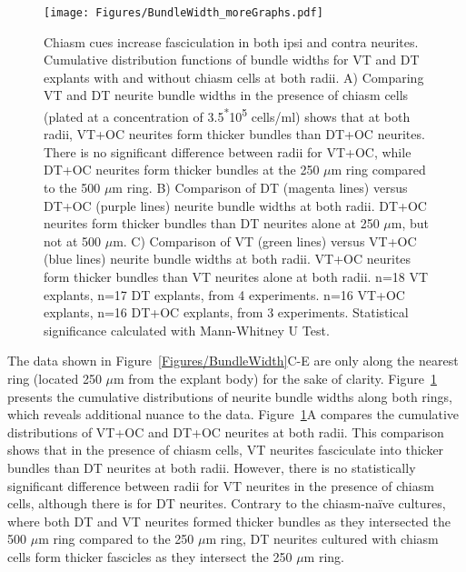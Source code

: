 \begin{figure}[hbtp]
    \begin{center}
        \texttt{[image: Figures/BundleWidth\_moreGraphs.pdf]}
        \caption[Chiasm cues increase fasciculation in both ipsi and contra neurites.]
        {Chiasm cues increase fasciculation in both ipsi and contra neurites.
        Cumulative distribution functions of bundle widths for VT and DT explants with and without chiasm cells at both radii.
        A) Comparing VT and DT neurite bundle widths in the presence of chiasm cells (plated at a concentration of 3.5\textsuperscript{*}10\textsuperscript{5} cells/ml) shows that at both radii, VT+OC neurites form thicker bundles than DT+OC neurites.
        There is no significant difference between radii for VT+OC, while DT+OC neurites form thicker bundles at the 250 $\mu$m ring compared to the 500 $\mu$m ring.
        B) Comparison of DT (magenta lines) versus DT+OC (purple lines) neurite bundle widths at both radii.
        DT+OC neurites form thicker bundles than DT neurites alone at 250 $\mu$m, but not at 500 $\mu$m.
        C) Comparison of VT (green lines) versus VT+OC (blue lines) neurite bundle widths at both radii.
        VT+OC neurites form thicker bundles than VT neurites alone at both radii.
        n=18 VT explants, n=17 DT explants, from 4 experiments.
        n=16 VT+OC explants, n=16 DT+OC explants, from 3 experiments.
        Statistical significance calculated with Mann-Whitney U Test.
        }
        \label{Figures/BundleWidthmoreGraphs}
    \end{center}
\end{figure}
The data shown in Figure~\ref{Figures/BundleWidth}C-E are only along the nearest ring (located 250 $\mu$m from the explant body) for the sake of clarity.
Figure~\ref{Figures/BundleWidthmoreGraphs} presents the cumulative distributions of neurite bundle widths along both rings, which reveals additional nuance to the data.
Figure~\ref{Figures/BundleWidthmoreGraphs}A compares the cumulative distributions of VT+OC and DT+OC neurites at both radii.
This comparison shows that in the presence of chiasm cells, VT neurites fasciculate into thicker bundles than DT neurites at both radii.
However, there is no statistically significant difference between radii for VT neurites in the presence of chiasm cells, although there is for DT neurites.
Contrary to the chiasm-na\"ive cultures, where both DT and VT neurites formed thicker bundles as they intersected the 500 $\mu$m ring compared to the 250 $\mu$m ring, DT neurites cultured with chiasm cells form thicker fascicles as they intersect the 250 $\mu$m ring.

